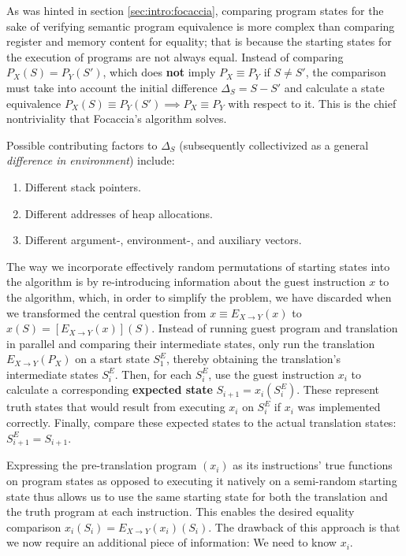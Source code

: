 As was hinted in section \ref{sec:intro:focaccia}, comparing program states for the sake of verifying semantic program
equivalence is more complex than comparing register and memory content for equality; that is because the starting states
for the execution of programs are not always equal. Instead of comparing $P_X(S) = P_Y(S')$, which does \textbf{not}
imply $P_X \equiv P_Y$ if $S \neq S'$, the comparison must take into account the initial difference $\Delta_S = S - S'$
and calculate a state equivalence $P_X(S) \equiv P_Y(S') \implies P_X \equiv P_Y$ with respect to it. This is the chief
nontriviality that Focaccia's algorithm solves.

Possible contributing factors to $\Delta_S$ (subsequently collectivized as a general \textit{difference in environment})
include:

\begin{enumerate}
    \item Different stack pointers.
    \item Different addresses of heap allocations.
    \item Different argument-, environment-, and auxiliary vectors.
\end{enumerate}

The way we incorporate effectively random permutations of starting states into the algorithm is by re-introducing
information about the guest instruction $x$ to the algorithm, which, in order to simplify the problem, we have discarded
when we transformed the central question from $x \equiv E_{X \rightarrow Y}(x)$ to $x(S) = [E_{X \rightarrow Y}(x)](S)$.
Instead of running guest program and translation in parallel and comparing their intermediate states, only run the
translation $E_{X \rightarrow Y}(P_X)$ on a start state $S^E_1$, thereby obtaining the translation's intermediate states
$S^E_i$. Then, for each $S^E_i$, use the guest instruction $x_i$ to calculate a corresponding \textbf{expected state}
$S_{i+1} = x_i(S^E_i)$. These represent truth states that would result from executing $x_i$ on $S^E_i$ if $x_i$ was
implemented correctly. Finally, compare these expected states to the actual translation states: $S^E_{i+1} = S_{i+1}$.

Expressing the pre-translation program $(x_i)$ as its instructions' true functions on program states as opposed to
executing it natively on a semi-random starting state thus allows us to use the same starting state for both the
translation and the truth program at each instruction. This enables the desired equality comparison $x_i(S_i) = E_{X
\rightarrow Y}(x_i)(S_i)$. The drawback of this approach is that we now require an additional piece of information: We
need to know $x_i$.

